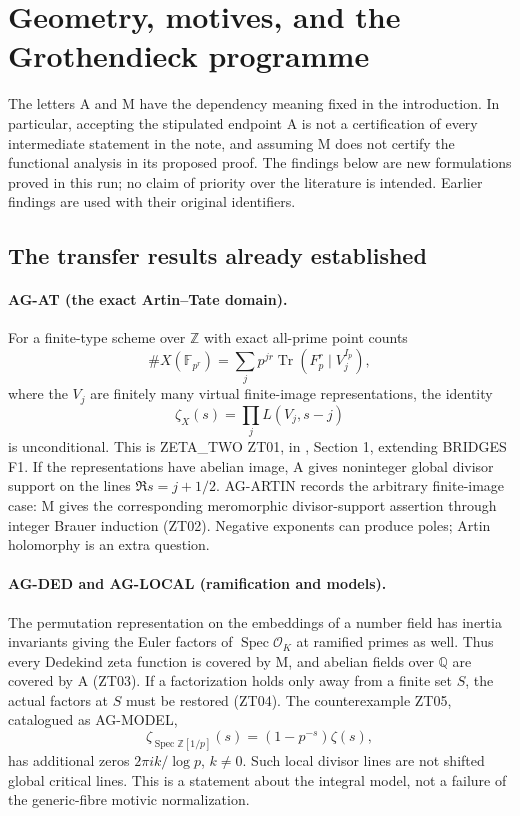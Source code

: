 \documentclass[11pt,a4paper]{article}
\begin{document}

\section{Geometry, motives, and the Grothendieck programme}
\label{sec:geometry}

The letters A and M have the dependency meaning fixed in the introduction.
In particular, accepting the stipulated endpoint A is not a certification of
every intermediate statement in the note, and assuming M does not certify
the functional analysis in its proposed proof. The findings below are new
formulations proved in this run; no claim of priority over the literature is
intended. Earlier findings are used with their original identifiers.

\subsection{The transfer results already established}
\label{ag:transfer}

\paragraph{AG-AT (the exact Artin--Tate domain).}
For a finite-type scheme over $\mathbb Z$ with exact all-prime point counts
\[
 \#X(\mathbb F_{p^r})=
 \sum_j p^{jr}\operatorname{Tr}(F_p^r\mid V_j^{I_p}),
\]
where the $V_j$ are finitely many virtual finite-image representations,
the identity
\[
 \zeta_X(s)=\prod_j L(V_j,s-j)
\]
is unconditional. This is ZETA\_TWO ZT01, in
, Section 1,
extending BRIDGES F1. If the representations have abelian image, A gives
noninteger global divisor support on the lines $\Re s=j+1/2$.
AG-ARTIN records the arbitrary finite-image case: M gives the corresponding meromorphic
divisor-support assertion through integer Brauer induction (ZT02).
Negative exponents can produce poles; Artin holomorphy is an extra question.

\paragraph{AG-DED and AG-LOCAL (ramification and models).}
The permutation representation on the embeddings of a number field has
inertia invariants giving the Euler factors of $\operatorname{Spec}\mathcal
O_K$ at ramified primes as well. Thus every Dedekind zeta function is covered
by M, and abelian fields over $\mathbb Q$ are covered by A (ZT03).
If a factorization holds only away from a finite set $S$, the actual factors
at $S$ must be restored (ZT04). The counterexample ZT05, catalogued as AG-MODEL,
\[
 \zeta_{\operatorname{Spec}\mathbb Z[1/p]}(s)
       =(1-p^{-s})\zeta(s),
\]
has additional zeros $2\pi i k/\log p$, $k\ne0$. Such local divisor lines
are not shifted global critical lines. This is a statement about the
integral model, not a failure of the generic-fibre motivic normalization.
\end{document}
